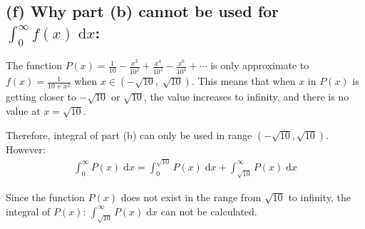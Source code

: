 \documentclass[12pt]{article}
\begin{document}
\subsection*{(f) Why part (b) cannot be used for ${\displaystyle \int_0^{\infty} f(x) \;\mathrm{d}x}$:}

\noindent The function $\displaystyle P(x)=\frac{1}{10}- \frac{x^2}{10^2}+ \frac{x^4}{10^3}- \frac{x^6}{10^4}+ \cdots$ is only approximate to $\displaystyle f(x)=\frac{1}{10+ x^2}$ when $\displaystyle x\in \left(-\sqrt{10},\; \sqrt{10} \right)$. This means that when $x$ in $P(x)$ is getting closer to $\displaystyle -\sqrt{10}$ or $\displaystyle \sqrt{10}$, the value increases to infinity, and there is no value at $x= \sqrt{10}$. \par
\noindent Therefore, integral of part (b) can only be used in range $\displaystyle \left(-\sqrt{10}, \sqrt{10} \right)$. However:
\begin{align*}
    \int_0^\infty P(x) \;\mathrm{d}x
    = \int_0^{\sqrt{10}} P(x) \;\mathrm{d}x
    + \int_{\sqrt{10}}^{\infty} P(x) \;\mathrm{d}x
\end{align*}

\noindent Since the function $P(x)$ does not exist in the range from $\displaystyle \sqrt{10}$ to infinity, the integral of $P(x)$: $\displaystyle \int_{\sqrt{10}}^{\infty} P(x) \;\mathrm{d}x$ can not be calculated.
\end{document}
